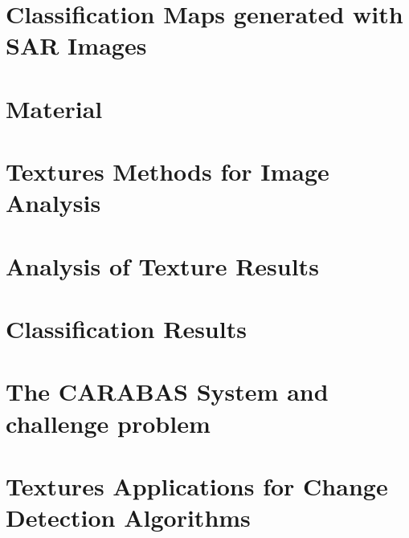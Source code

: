 \documentclass[msc, eng]{ita}    %
\begin{document}
\chapter{Classification Maps generated with SAR Images}
\label{cap:requisitos}


\chapter{Material}
\label{cap:material rondonia}


\chapter{Textures Methods for Image Analysis}
\label{cap:texture_methods}


\chapter{Analysis of Texture Results}
\label{cap:analysis_texture_results}


\chapter{Classification Results}
\label{cap:classification_results}




\chapter{The CARABAS System and challenge problem}
\label{cap:carabas_chapter}


\chapter{Textures Applications for Change Detection Algorithms}
\label{cap:cda_chapter}


% 

% 
\end{document}
